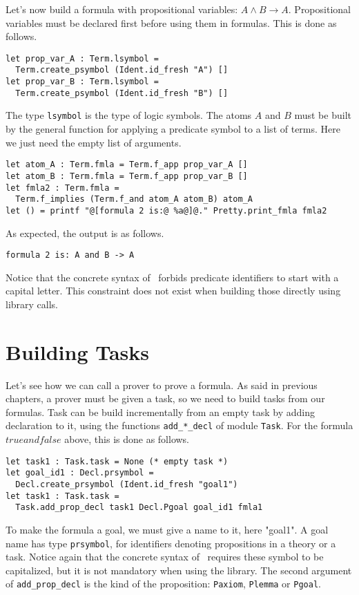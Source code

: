 Let's now build a formula with propositional variables: $A \land B
\rightarrow A$. Propositional variables must be declared first before
using them in formulas. This is done as follows.
\begin{verbatim}
let prop_var_A : Term.lsymbol = 
  Term.create_psymbol (Ident.id_fresh "A") []
let prop_var_B : Term.lsymbol = 
  Term.create_psymbol (Ident.id_fresh "B") []
\end{verbatim}
The type \texttt{lsymbol} is the type of logic symbols. The atoms $A$ and $B$
must be built by the general function for applying a predicate symbol to a list of terms. Here we just need the empty list of arguments.
\begin{verbatim}
let atom_A : Term.fmla = Term.f_app prop_var_A []
let atom_B : Term.fmla = Term.f_app prop_var_B []
let fmla2 : Term.fmla = 
  Term.f_implies (Term.f_and atom_A atom_B) atom_A
let () = printf "@[formula 2 is:@ %a@]@." Pretty.print_fmla fmla2
\end{verbatim}

As expected, the output is as follows.
\begin{verbatim}
formula 2 is: A and B -> A
\end{verbatim}
Notice that the concrete syntax of \why\ forbids predicate identifiers
to start with a capital letter. This constraint does not exist when
building those directly using library calls.

\section{Building Tasks}

Let's see how we can call a prover to prove a formula. As said in
previous chapters, a prover must be given a task, so we need to build
tasks from our formulas. Task can be build incrementally from an empty
task by adding declaration to it, using the functions
\texttt{add\_*\_decl} of module \texttt{Task}. For the formula $true and
false$ above, this is done as follows.
\begin{verbatim}
let task1 : Task.task = None (* empty task *)
let goal_id1 : Decl.prsymbol = 
  Decl.create_prsymbol (Ident.id_fresh "goal1") 
let task1 : Task.task = 
  Task.add_prop_decl task1 Decl.Pgoal goal_id1 fmla1
\end{verbatim}
To make the formula a goal, we must give a name to it, here "goal1". A
goal name has type \texttt{prsymbol}, for identifiers denoting
propositions in a theory or a task. Notice again that the concrete
syntax of \why\ requires these symbol to be capitalized, but it is not
mandatory when using the library. The second argument of
\texttt{add\_prop\_decl} is the kind of the proposition:
\texttt{Paxiom}, \texttt{Plemma} or \texttt{Pgoal}.


